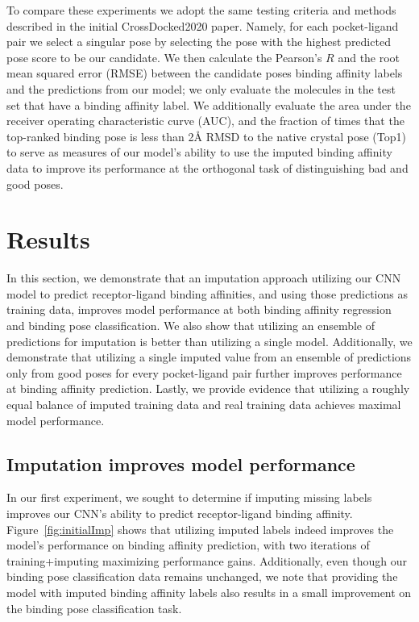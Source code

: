 \documentclass[journal=jmcmar,manuscript=article]{achemso}
\begin{document}
To compare these experiments we adopt the same testing criteria and methods described in the initial CrossDocked2020 paper\cite{crossdocked2020}.
Namely, for each pocket-ligand pair we select a singular pose by selecting the pose with the highest predicted pose score to be our candidate. 
We then calculate the Pearson's $R$ and the root mean squared error (RMSE) between the candidate poses binding affinity labels and the predictions from our model; we only evaluate the molecules in the test set that have a binding affinity label.
We additionally evaluate the area under the receiver operating characteristic curve (AUC), and the fraction of times that the top-ranked binding pose is less than 2{\AA} RMSD to the native crystal pose (Top1) to serve as measures of our model's ability to use the imputed binding affinity data to improve its performance at the orthogonal task of distinguishing bad and good poses.


\section{Results}
In this section, we demonstrate that an imputation approach utilizing our CNN model to predict receptor-ligand binding affinities, and using those predictions as training data, improves model performance at both binding affinity regression and binding pose classification.
We also show that utilizing an ensemble of predictions for imputation is better than utilizing a single model.
Additionally, we demonstrate that utilizing a single imputed value from an ensemble of predictions only from good poses for every pocket-ligand pair further improves performance at binding affinity prediction.
Lastly, we provide evidence that utilizing a roughly equal balance of imputed training data and real training data achieves maximal model performance.

\subsection{Imputation improves model performance}
In our first experiment, we sought to determine if imputing missing labels improves our CNN's ability to predict receptor-ligand binding affinity.
Figure~\ref{fig:initialImp} shows that utilizing imputed labels indeed improves the model's performance on binding affinity prediction, with two iterations of training+imputing maximizing performance gains.
Additionally, even though our binding pose classification data remains unchanged, we note that providing the model with imputed binding affinity labels also results in a small improvement on the binding pose classification task.
\end{document}
